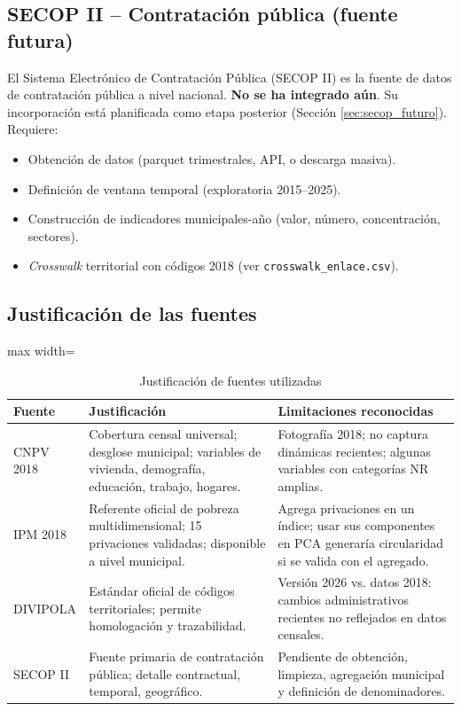 \subsection{SECOP II -- Contratación pública (fuente futura)}
\label{sec:secop_fuente}

El Sistema Electrónico de Contratación Pública (SECOP II) es la fuente de datos de contratación pública a nivel nacional. \textbf{No se ha integrado aún}. Su incorporación está planificada como etapa posterior (Sección \ref{sec:secop_futuro}). Requiere:

\begin{itemize}
    \item Obtención de datos (parquet trimestrales, API, o descarga masiva).
    \item Definición de ventana temporal (exploratoria 2015--2025).
    \item Construcción de indicadores municipales-año (valor, número, concentración, sectores).
    \item \textit{Crosswalk} territorial con códigos 2018 (ver \texttt{crosswalk\_enlace.csv}).
\end{itemize}

\subsection{Justificación de las fuentes}
\label{sec:justificacion_fuentes}

\begin{table}[htbp]
\centering
\caption{Justificación de fuentes utilizadas}
\label{tab:justificacion_fuentes}
\begin{adjustbox}{max width=\textwidth}
\begin{tabular}{@{}lll@{}}
\toprule
\textbf{Fuente} & \textbf{Justificación} & \textbf{Limitaciones reconocidas} \\
\midrule
CNPV 2018 & Cobertura censal universal; desglose municipal; variables de vivienda, demografía, educación, trabajo, hogares. & Fotografía 2018; no captura dinámicas recientes; algunas variables con categorías NR amplias. \\
IPM 2018 & Referente oficial de pobreza multidimensional; 15 privaciones validadas; disponible a nivel municipal. & Agrega privaciones en un índice; usar sus componentes en PCA generaría circularidad si se valida con el agregado. \\
DIVIPOLA & Estándar oficial de códigos territoriales; permite homologación y trazabilidad. & Versión 2026 vs. datos 2018: cambios administrativos recientes no reflejados en datos censales. \\
SECOP II & Fuente primaria de contratación pública; detalle contractual, temporal, geográfico. & Pendiente de obtención, limpieza, agregación municipal y definición de denominadores. \\
\bottomrule
\end{tabular}
\end{adjustbox}
\end{table}


